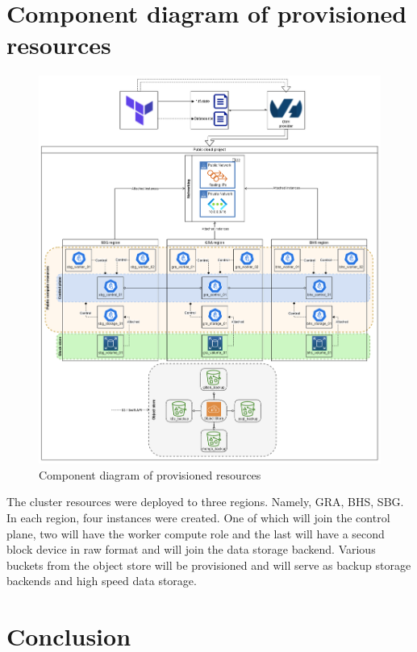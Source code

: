 \section{Component diagram of provisioned resources}
\begin{figure}[H]\centering
\includegraphics[width=1.0\textwidth,angle=00]{assets/f15.png}
\caption{Component diagram of provisioned resources}
\label{fig:fig15}
\end{figure}

The cluster resources were deployed to three regions. Namely, GRA, BHS, SBG. In each region, four instances were created. One of which will join the control plane, two will have the worker compute role and the last will have a second block device in raw format and will join the data storage backend. Various buckets from the object store will be provisioned and will serve as backup storage backends and high speed data storage.  



\section*{Conclusion}
